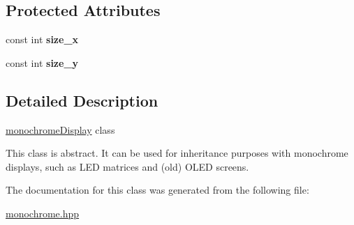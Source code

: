 \subsection*{Protected Attributes}
\begin{DoxyCompactItemize}
\item 
const int {\bfseries size\+\_\+x}\hypertarget{classmonochrome_display_a76aee278fd30daf328f081020af3d843}{}\label{classmonochrome_display_a76aee278fd30daf328f081020af3d843}

\item 
const int {\bfseries size\+\_\+y}\hypertarget{classmonochrome_display_ab3eccf828513020fd3e62e23c531d594}{}\label{classmonochrome_display_ab3eccf828513020fd3e62e23c531d594}

\end{DoxyCompactItemize}


\subsection{Detailed Description}
\hyperlink{classmonochrome_display}{monochrome\+Display} class 

This class is abstract. It can be used for inheritance purposes with monochrome displays, such as L\+ED matrices and (old) O\+L\+ED screens. 

The documentation for this class was generated from the following file\+:\begin{DoxyCompactItemize}
\item 
\hyperlink{monochrome_8hpp}{monochrome.\+hpp}\end{DoxyCompactItemize}
